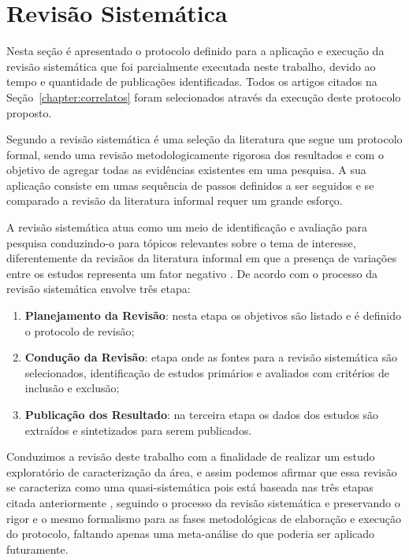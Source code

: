 \section{Revisão Sistemática}

Nesta seção é apresentado o protocolo definido para a aplicação e execução da revisão sistemática que foi parcialmente executada
neste trabalho, devido ao tempo e quantidade de publicações 
identificadas. Todos os artigos citados na Seção~\ref{chapter:correlatos} foram selecionados através da execução deste protocolo proposto.

			Segundo \citeauthor{Kitchenham:2009:SLR:1465742.1466091}  a revisão sistemática é uma seleção da literatura que segue um protocolo formal, sendo uma revisão metodologicamente rigorosa dos resultados e com o objetivo de agregar todas as evidências existentes em uma pesquisa. A sua aplicação consiste em umas sequência de passos definidos a ser seguidos e se comparado a revisão da literatura informal requer um grande esforço.
			
			\par 
			A revisão sistemática atua como um meio de identificação  e avaliação para pesquisa conduzindo-o para tópicos relevantes sobre o tema de interesse, diferentemente da revisãos da literatura informal em que a presença de variações entre os estudos representa um fator negativo
			\cite{MafraTravassos}. 
			De acordo com \citeauthor{MafraTravassos} o processo da revisão sistemática envolve três etapa: 
			\begin{enumerate}
			    \item \textbf{Planejamento da Revisão}: nesta etapa os objetivos são listado e é definido o protocolo de revisão;
			    \item \textbf{Condução da Revisão}: etapa onde as fontes para a revisão sistemática são selecionados, identificação de estudos primários e avaliados com critérios de inclusão e exclusão;
			    \item \textbf{Publicação dos Resultado}: na terceira etapa os dados dos estudos são extraídos e sintetizados para serem publicados.
			\end{enumerate}
			
			\par 
			Conduzimos a revisão deste trabalho com a finalidade de realizar um estudo exploratório de caracterização da área, e assim podemos afirmar que essa revisão se caracteriza como uma quasi-sistemática pois está baseada nas três etapas citada anteriormente \cite{MafraTravassos}, seguindo o processo da revisão sistemática e preservando o rigor e o mesmo formalismo para as fases metodológicas de elaboração e execução do protocolo, faltando apenas uma meta-análise do que poderia ser aplicado futuramente.
			

